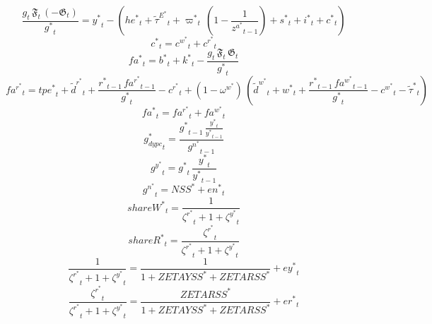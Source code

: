 \begin{dmath}
\frac{{{g}}_{t}\, {{\mathfrak{F}}}_{t}\, \left(-{{\mathfrak{G}}}_{t}\right)}{{{g^*}}_{t}}={{y^*}}_{t}-\left({{he^*}}_{t}+{\tilde{\tau}^E^*}_{t}+{{\varpi^*}}_{t}\, \left(1-\frac{1}{{{z^a^*}}_{t-1}}\right)+{{s^*}}_{t}+{{i^*}}_{t}+{{c^*}}_{t}\right)
\end{dmath}
\begin{dmath}
{{c^*}}_{t}={{c^w^*}}_{t}+{{c^r^*}}_{t}
\end{dmath}
\begin{dmath}
{{fa^*}}_{t}={{b^*}}_{t}+{{k^*}}_{t}-\frac{{{g}}_{t}\, {{\mathfrak{F}}}_{t}\, {{\mathfrak{G}}}_{t}}{{{g^*}}_{t}}
\end{dmath}
\begin{dmath}
{{fa^r^*}}_{t}={{tpe^*}}_{t}+{\tilde{d}^r^*}_{t}+\frac{{{r^*}}_{t-1}\, {{fa^r^*}}_{t-1}}{{{g^*}}_{t}}-{{c^r^*}}_{t}+\left(1-{{\omega^w^*}}\right)\, \left({\tilde{d}^w^*}_{t}+{{w^*}}_{t}+\frac{{{r^*}}_{t-1}\, {{fa^w^*}}_{t-1}}{{{g^*}}_{t}}-{{c^w^*}}_{t}-{\tilde{\tau}^*}_{t}\right)
\end{dmath}
\begin{dmath}
{{fa^*}}_{t}={{fa^r^*}}_{t}+{{fa^w^*}}_{t}
\end{dmath}
\begin{dmath}
{{g_{dypc}^*}}_{t}=\frac{{{g^*}}_{t-1}\, \frac{{{y^*}}_{t}}{{{y^*}}_{t-1}}}{{{g^n^*}}_{t-1}}
\end{dmath}
\begin{dmath}
{{g^y^*}}_{t}={{g^*}}_{t}\, \frac{{{y^*}}_{t}}{{{y^*}}_{t-1}}
\end{dmath}
\begin{dmath}
{{g^n^*}}_{t}={{NSS^*}}+{{en^*}}_{t}
\end{dmath}
\begin{dmath}
{{shareW^*}}_{t}=\frac{1}{{{\zeta^r^*}}_{t}+1+{{\zeta^y^*}}_{t}}
\end{dmath}
\begin{dmath}
{{shareR^*}}_{t}=\frac{{{\zeta^r^*}}_{t}}{{{\zeta^r^*}}_{t}+1+{{\zeta^y^*}}_{t}}
\end{dmath}
\begin{dmath}
\frac{1}{{{\zeta^r^*}}_{t}+1+{{\zeta^y^*}}_{t}}=\frac{1}{1+{{ZETAYSS^*}}+{{ZETARSS^*}}}+{{ey^*}}_{t}
\end{dmath}
\begin{dmath}
\frac{{{\zeta^r^*}}_{t}}{{{\zeta^r^*}}_{t}+1+{{\zeta^y^*}}_{t}}=\frac{{{ZETARSS^*}}}{1+{{ZETAYSS^*}}+{{ZETARSS^*}}}+{{er^*}}_{t}
\end{dmath}
